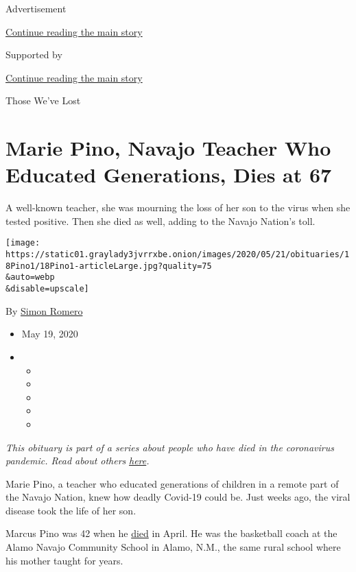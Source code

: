 Advertisement

\protect\hyperlink{after-top}{Continue reading the main story}

Supported by

\protect\hyperlink{after-sponsor}{Continue reading the main story}

Those We've Lost

\hypertarget{marie-pino-navajo-teacher-who-educated-generations-dies-at-67}{%
\section{Marie Pino, Navajo Teacher Who Educated Generations, Dies at
67}\label{marie-pino-navajo-teacher-who-educated-generations-dies-at-67}}

A well-known teacher, she was mourning the loss of her son to the virus
when she tested positive. Then she died as well, adding to the Navajo
Nation's toll.

\texttt{[image: https://static01.graylady3jvrrxbe.onion/images/2020/05/21/obituaries/18Pino1/18Pino1-articleLarge.jpg?quality=75\\\&auto=webp\\\&disable=upscale]}

By \href{https://www.nytimes3xbfgragh.onion/by/simon-romero}{Simon
Romero}

\begin{itemize}
\item
  May 19, 2020
\item
  \begin{itemize}
  \item
  \item
  \item
  \item
  \item
  \end{itemize}
\end{itemize}

\emph{This obituary is part of a series about people who have died in
the coronavirus pandemic. Read about others}
\href{https://www.nytimes3xbfgragh.onion/series/people-who-have-died-of-the-coronavirus}{\emph{here}}\emph{.}

Marie Pino, a teacher who educated generations of children in a remote
part of the Navajo Nation, knew how deadly Covid-19 could be. Just weeks
ago, the viral disease took the life of her son.

Marcus Pino was 42 when he
\href{https://www.abqjournal.com/1445029/alamo-navajo-hoops-coach-pino-dies-from-virus.html}{died}
in April. He was the basketball coach at the Alamo Navajo Community
School in Alamo, N.M., the same rural school where his mother taught for
years.

